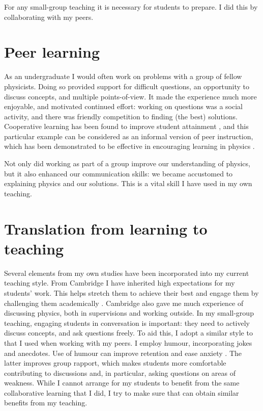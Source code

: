 \documentclass[a4paper, 11pt, twoside]{article}
\begin{document}
For any small-group teaching it is necessary for students to prepare. I did this by collaborating with my peers.

\section{Peer learning}\label{sec:peer}

As an undergraduate I would often work on problems with a group of fellow physicists. Doing so provided support for difficult questions, an opportunity to discuss concepts, and multiple points-of-view. It made the experience much more enjoyable, and motivated continued effort: working on questions was a social activity, and there was friendly competition to finding (the best) solutions. Cooperative learning has been found to improve student attainment \citep{Qin1995,Cabrera2002}, and this particular example can be considered as an informal version of peer instruction, which has been demonstrated to be effective in encouraging learning in physics \citep{Crouch2001,Pilzer2001,Miller2006}.

Not only did working as part of a group improve our understanding of physics, but it also enhanced our communication skills: we became accustomed to explaining physics and our solutions. This is a vital skill I have used in my own teaching.

\section{Translation from learning to teaching}

Several elements from my own studies have been incorporated into my current teaching style. From Cambridge I have inherited high expectations for my students' work. This helps stretch them to achieve their best and engage them by challenging them academically \citep{Bamber2015}. Cambridge also gave me much experience of discussing physics, both in supervisions and working outside. In my small-group teaching, engaging students in conversation is important: they need to actively discuss concepts, and ask questions freely. To aid this, I adopt a similar style to that I used when working with my peers. I employ humour, incorporating jokes and anecdotes. Use of humour can improve retention and ease anxiety \citep[e.g.,][and references therein]{Korobkin1988,Lesser2008}. The latter improves group rapport, which makes students more comfortable contributing to discussions and, in particular, asking questions on areas of weakness. While I cannot arrange for my students to benefit from the same collaborative learning that I did, I try to make sure that can obtain similar benefits from my teaching.



\end{document}
